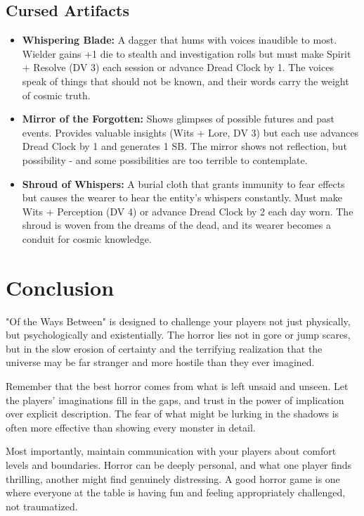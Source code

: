 \documentclass[11pt]{article}
\begin{document}
\subsection{Cursed Artifacts}

\begin{itemize}
\item \textbf{Whispering Blade:} A dagger that hums with voices inaudible to most. Wielder gains +1 die to stealth and investigation rolls but must make Spirit + Resolve (DV 3) each session or advance Dread Clock by 1. The voices speak of things that should not be known, and their words carry the weight of cosmic truth.
\item \textbf{Mirror of the Forgotten:} Shows glimpses of possible futures and past events. Provides valuable insights (Wits + Lore, DV 3) but each use advances Dread Clock by 1 and generates 1 SB. The mirror shows not reflection, but possibility - and some possibilities are too terrible to contemplate.
\item \textbf{Shroud of Whispers:} A burial cloth that grants immunity to fear effects but causes the wearer to hear the entity's whispers constantly. Must make Wits + Perception (DV 4) or advance Dread Clock by 2 each day worn. The shroud is woven from the dreams of the dead, and its wearer becomes a conduit for cosmic knowledge.
\end{itemize}

\section{Conclusion}

"Of the Ways Between" is designed to challenge your players not just physically, but psychologically and existentially. The horror lies not in gore or jump scares, but in the slow erosion of certainty and the terrifying realization that the universe may be far stranger and more hostile than they ever imagined.

Remember that the best horror comes from what is left unsaid and unseen. Let the players' imaginations fill in the gaps, and trust in the power of implication over explicit description. The fear of what might be lurking in the shadows is often more effective than showing every monster in detail.

Most importantly, maintain communication with your players about comfort levels and boundaries. Horror can be deeply personal, and what one player finds thrilling, another might find genuinely distressing. A good horror game is one where everyone at the table is having fun and feeling appropriately challenged, not traumatized.
\end{document}
